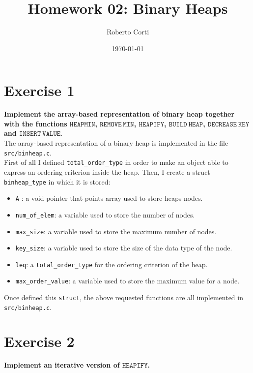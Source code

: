 \documentclass{article}
\title{Homework 02: Binary Heaps}
\date{\today}
\author{Roberto Corti}
\begin{document}
	\maketitle
	
	\section*{Exercise 1}
	\textbf{Implement the array-based representation of binary heap together with the functions $\mathtt{HEAP MIN}$, $\mathtt{REMOVE ~ MIN}$, $\mathtt{HEAPIFY}$, $\mathtt{BUILD ~  HEAP}$, $\mathtt{DECREASE ~ KEY}$ and $\mathtt{INSERT ~ VALUE}$}. \\
	
	\noindent The array-based representation of a binary heap is implemented in the file \texttt{src/binheap.c}.  \\
	First of all I defined \texttt{total\_order\_type} in order to make an object able to express an ordering criterion inside the heap. Then, I create a struct \texttt{binheap\_type} in which it is stored:
	\begin{itemize}
		\item \texttt{A} : a void pointer that points array used to store heaps nodes.
		\item \texttt{num\_of\_elem}: a variable used to store the number of nodes.
		\item \texttt{max\_size}: a variable used to store the maximum number of nodes.
		\item \texttt{key\_size}: a variable used to store the size of the data type of the node.
		\item \texttt{leq}: a \texttt{total\_order\_type} for the ordering criterion of the heap.
		\item \texttt{max\_order\_value}: a variable used to store the maximum value for a node.
	\end{itemize}
Once defined this \texttt{struct}, the above requested functions are all implemented in \texttt{src/binheap.c}.
		
	\section*{Exercise 2}
	\textbf{Implement an iterative version of $\mathtt{HEAPIFY}$.} \\
	
\end{document}
